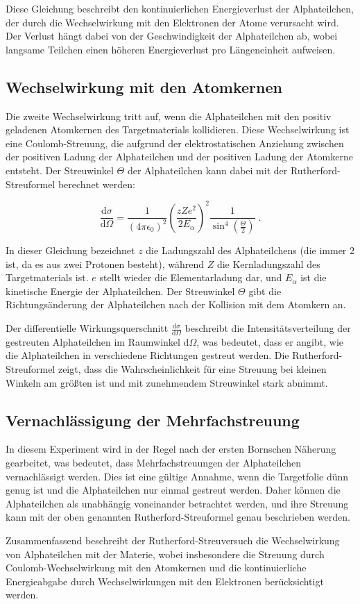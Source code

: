Diese Gleichung beschreibt den kontinuierlichen Energieverlust der Alphateilchen, der durch die Wechselwirkung mit den Elektronen der Atome verursacht wird. Der Verlust hängt dabei von der Geschwindigkeit der Alphateilchen ab, wobei langsame Teilchen einen höheren Energieverlust pro Längeneinheit aufweisen.

\subsection*{Wechselwirkung mit den Atomkernen}
Die zweite Wechselwirkung tritt auf, wenn die Alphateilchen mit den positiv geladenen Atomkernen des Targetmaterials kollidieren. Diese Wechselwirkung ist eine Coulomb-Streuung, die aufgrund der elektrostatischen Anziehung zwischen der positiven Ladung der Alphateilchen und der positiven Ladung der Atomkerne entsteht. Der Streuwinkel $\Theta$ der Alphateilchen kann dabei mit der Rutherford-Streuformel berechnet werden:

\[
\frac{\mathrm{d}\sigma}{\mathrm{d}\Omega} = \frac{1}{(4 \pi \epsilon_0)^2} \left( \frac{z Z e^2}{2 E_\alpha} \right)^2 \frac{1}{\sin^4\left(\frac{\Theta}{2}\right)}\; .
\]

In dieser Gleichung bezeichnet $z$ die Ladungszahl des Alphateilchens (die immer 2 ist, da es aus zwei Protonen besteht), während $Z$ die Kernladungszahl des Targetmaterials ist. $e$ stellt wieder die Elementarladung dar, und $E_\alpha$ ist die kinetische Energie der Alphateilchen. Der Streuwinkel $\Theta$ gibt die Richtungsänderung der Alphateilchen nach der Kollision mit dem Atomkern an. 

Der differentielle Wirkungsquerschnitt $\frac{\mathrm{d}\sigma}{\mathrm{d}\Omega}$ beschreibt die Intensitätsverteilung der gestreuten Alphateilchen im Raumwinkel $\mathrm{d}\Omega$, was bedeutet, dass er angibt, wie die Alphateilchen in verschiedene Richtungen gestreut werden. Die Rutherford-Streuformel zeigt, dass die Wahrscheinlichkeit für eine Streuung bei kleinen Winkeln am größten ist und mit zunehmendem Streuwinkel stark abnimmt.

\subsection*{Vernachlässigung der Mehrfachstreuung}
In diesem Experiment wird in der Regel nach der ersten Bornschen Näherung gearbeitet, was bedeutet, dass Mehrfachstreuungen der Alphateilchen vernachlässigt werden. Dies ist eine gültige Annahme, wenn die Targetfolie dünn genug ist und die Alphateilchen nur einmal gestreut werden. Daher können die Alphateilchen als unabhängig voneinander betrachtet werden, und ihre Streuung kann mit der oben genannten Rutherford-Streuformel genau beschrieben werden.

Zusammenfassend beschreibt der Rutherford-Streuversuch die Wechselwirkung von Alphateilchen mit der Materie, wobei insbesondere die Streuung durch Coulomb-Wechselwirkung mit den Atomkernen und die kontinuierliche Energieabgabe durch Wechselwirkungen mit den Elektronen berücksichtigt werden.
